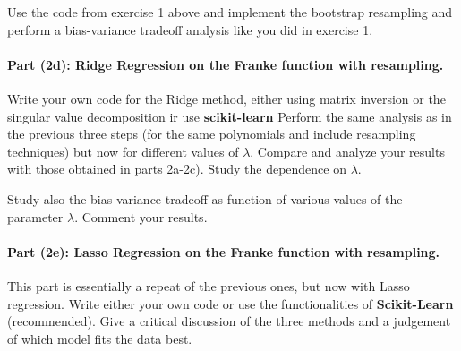 \documentclass[%
oneside,                 %
final,                   %
10pt]{article}
\begin{document}
Use the code from exercise 1 above and implement the bootstrap
resampling and perform a bias-variance tradeoff analysis like you did
in exercise 1.

\paragraph{Part (2d): Ridge Regression on the Franke function  with resampling.}
Write your own code for the Ridge method, either using matrix
inversion or the singular value decomposition ir use \textbf{scikit-learn} 
Perform the same analysis as in the
previous three steps (for the same polynomials and include resampling
techniques) but now for different values of $\lambda$. Compare and
analyze your results with those obtained in parts 2a-2c). Study the
dependence on $\lambda$.

Study also the bias-variance tradeoff as function of various values of
the parameter $\lambda$. Comment your results. 

\paragraph{Part (2e): Lasso Regression on the Franke function  with resampling.}
This part is essentially a repeat of the previous ones, but now
with Lasso regression. Write either your own code or
use the functionalities of \textbf{Scikit-Learn} (recommended). 
Give a
critical discussion of the three methods and a judgement of which
model fits the data best.



\end{document}
